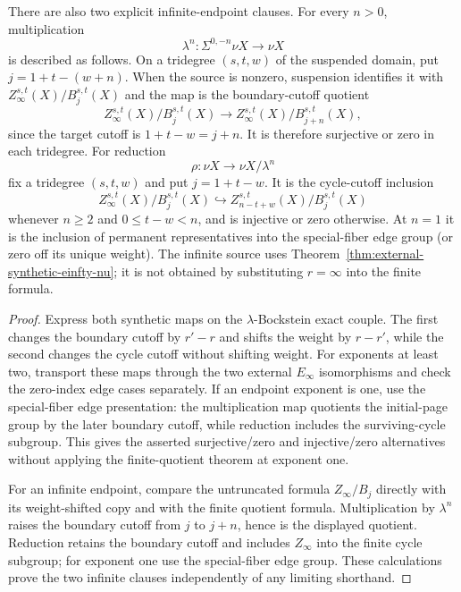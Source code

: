 \begin{proposition}
  There are also two explicit infinite-endpoint clauses.  For every $n>0$,
  multiplication
  \[
    \lambda^n:\Sigma^{0,-n}\nu X\longrightarrow\nu X
  \]
  is described as follows.  On a tridegree $(s,t,w)$ of the suspended domain,
  put $j=1+t-(w+n)$.  When the source is nonzero, suspension identifies it
  with $Z_\infty^{s,t}(X)/B_j^{s,t}(X)$ and the map is the
  boundary-cutoff quotient
  \[
    Z_\infty^{s,t}(X)/B_j^{s,t}(X)
      \longrightarrow
    Z_\infty^{s,t}(X)/B_{j+n}^{s,t}(X),
  \]
  since the target cutoff is $1+t-w=j+n$.  It is therefore surjective or zero
  in each tridegree.  For reduction
  \[
    \rho:\nu X\longrightarrow\nu X/\lambda^n
  \]
  fix a tridegree $(s,t,w)$ and put $j=1+t-w$.  It is the cycle-cutoff inclusion
  \[
    Z_\infty^{s,t}(X)/B_j^{s,t}(X)
      \hookrightarrow
    Z_{n-t+w}^{s,t}(X)/B_j^{s,t}(X)
  \]
  whenever $n\ge2$ and $0\le t-w<n$, and is injective or zero otherwise.  At
  $n=1$ it is the inclusion of permanent representatives
  into the special-fiber edge group (or zero off its unique weight).  The
  infinite source uses Theorem~\ref{thm:external-synthetic-einfty-nu}; it is
  not obtained by substituting $r=\infty$ into the finite formula.
\end{proposition}

\begin{proof}
  Express both synthetic maps on the $\lambda$-Bockstein exact couple.  The
  first changes the boundary cutoff by $r'-r$ and shifts the weight by
  $r-r'$, while the second changes the cycle cutoff without shifting weight.
  For exponents at least two, transport these maps through the two external
  $E_\infty$ isomorphisms and check the zero-index edge cases separately.  If
  an endpoint exponent is one, use the special-fiber edge presentation: the
  multiplication map quotients the initial-page group by the later boundary
  cutoff, while reduction includes the surviving-cycle subgroup.  This gives
  the asserted surjective/zero and injective/zero alternatives without
  applying the finite-quotient theorem at exponent one.

  For an infinite endpoint, compare the untruncated formula
  $Z_\infty/B_j$ directly with its weight-shifted copy and with the finite
  quotient formula.  Multiplication by $\lambda^n$ raises the boundary cutoff
  from $j$ to $j+n$, hence is the displayed quotient.  Reduction retains the
  boundary cutoff and includes $Z_\infty$ into the finite cycle subgroup; for
  exponent one use the special-fiber edge group.  These calculations prove
  the two infinite clauses independently of any limiting shorthand.
\end{proof}

